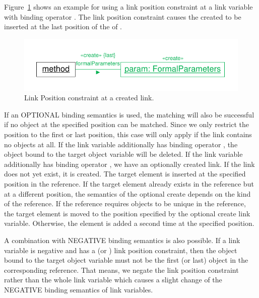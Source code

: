 {Figure~\ref{fig:linkPositionConstraintCreate} shows an example for using a link position constraint at a link variable with binding operator \create. The link position constraint causes the created  to be inserted at the last position of the  of .

\begin{figure}[htbp]
\center
\includegraphics[width=0.75\columnwidth]{figures/LinkPositionConstraintCreate}
\caption{Link Position constraint at a created link.}
\label{fig:linkPositionConstraintCreate}
\end{figure}

If an OPTIONAL binding semantics is used, the matching will also be successful if no object at the specified position can be matched. Since we only restrict the position to the first or last position, this case will only apply if the link contains no objects at all. If the link variable additionally has binding operator \destroy, the object bound to the target object variable will be deleted. If the link variable additionally has binding operator \create, we have an optionally created link. If the link does not yet exist, it is created. The target element is inserted at the specified position in the reference. If the target element already exists in the reference but at a different position, the semantics of the optional create depends on the kind of the reference. If the reference requires objects to be unique in the reference, the target element is moved to the position specified by the optional create link variable. Otherwise, the element is added a second time at the specified position.

A combination with NEGATIVE binding semantics is also possible. If a link variable is negative and has a  (or ) link position constraint, then the object bound to the target object variable must not be the first (or last) object in the corresponding reference. That means, we negate the link position constraint rather than the whole link variable which causes a slight change of the NEGATIVE binding semantics of link variables.


}
